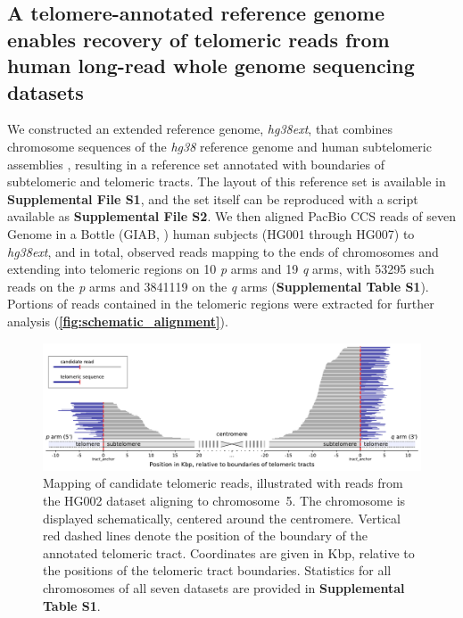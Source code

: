 \documentclass{article}
\begin{document}
\subsection*{A telomere-annotated reference genome enables recovery of telomeric reads from human long-read whole genome sequencing datasets}
    We constructed an extended reference genome, \textit{hg38ext},
        that combines chromosome sequences of the \textit{hg38} reference genome \cite{grch38,hg38}
            and human subtelomeric assemblies \cite{riethman2014},
        resulting in a reference set annotated with boundaries of subtelomeric and telomeric tracts.
        The layout of this reference set is available in \textbf{Supplemental File S1},
            and the set itself can be reproduced with a script available as \textbf{Supplemental File S2}.
    We then aligned PacBio CCS reads of seven Genome in a Bottle (GIAB, \cite{giab}) human subjects (HG001 through HG007) to \textit{hg38ext},
        and in total, observed reads mapping to the ends of chromosomes and extending into telomeric regions
            on 10 \textit{p} arms and 19 \textit{q} arms,
                with 53\textendash{}295 such reads on the \textit{p} arms
                and 384\textendash{}1119 on the \textit{q} arms
                    (\textbf{Supplemental Table S1}).
    Portions of reads contained in the telomeric regions were extracted for further analysis (\textbf{\autoref{fig:schematic_alignment}}).
        \begin{figure}[h!] \centering %
        \includegraphics[height=.75\textheight,width=\textwidth,keepaspectratio]{renders/figures/Figure-1.pdf}
        \caption{
             \small Mapping of candidate telomeric reads, illustrated with reads from the HG002 dataset aligning to \mbox{chromosome 5.}
             The chromosome is displayed schematically, centered around the centromere.
             Vertical red dashed lines denote the position of the boundary of the annotated telomeric tract.
             Coordinates are given in Kbp, relative to the positions of the telomeric tract boundaries.
             Statistics for all chromosomes of all seven datasets are provided in \textbf{Supplemental Table S1}.
        }
        \label{fig:schematic_alignment}
        \end{figure}
\end{document}
